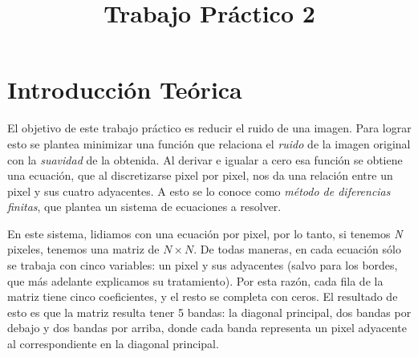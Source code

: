 \documentclass[a4paper]{article}
\title{Trabajo Práctico 2}
\begin{document}


\maketitle

\newpage

\tableofcontents


\newpage

\section{Introducción Teórica}

El objetivo de este trabajo práctico es reducir el ruido de una imagen. Para lograr esto se plantea minimizar una función que relaciona el \textit{ruido} de la imagen original con la \textit{suavidad} de la obtenida. Al derivar e igualar a cero esa función se obtiene una ecuación, que al discretizarse pixel por pixel, nos da una relación entre un pixel y sus cuatro adyacentes. A esto se lo conoce como \textit{método de diferencias finitas}, que plantea un sistema de ecuaciones a resolver.

En este sistema, lidiamos con una ecuación por pixel, por lo tanto, si tenemos \textit{N} pixeles, tenemos una matriz de $N \times N$. De todas maneras, en cada ecuación sólo se trabaja con cinco variables: un pixel y sus adyacentes (salvo para los bordes, que más adelante explicamos su tratamiento). Por esta razón, cada fila de la matriz tiene cinco coeficientes, y el resto se completa con ceros. El resultado de esto es que la matriz resulta tener 5 bandas: la diagonal principal, dos bandas por debajo y dos bandas por arriba, donde cada banda representa un pixel adyacente al correspondiente en la diagonal principal.
\end{document}
